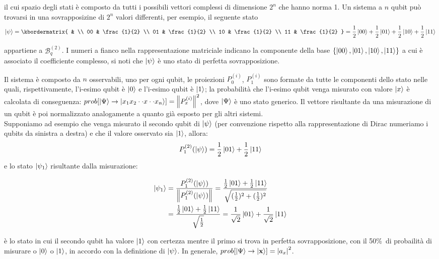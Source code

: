 \documentclass[12pt,a4paper,openright]{report}
\newcommand{\norm}[1]{\left\lVert#1\right\rVert}
\begin{document}
il cui spazio degli stati è composto da tutti i possibili vettori complessi di dimensione $2^n$ che hanno norma 1. Un sistema a $n$ qubit può trovarsi in una sovrapposizine di $2^n$ valori differenti, per esempio, il seguente stato  
\[
    \ket{\psi} = 
         \kbordermatrix{
              &    \\
          00 & \frac{1}{2} \\
          01 & \frac{1}{2} \\
          10 & \frac{1}{2} \\
          11 & \frac{1}{2}   
            } = \frac{1}{2}\ket{00} + \frac{1}{2}\ket{01} + \frac{1}{2}\ket{10} + \frac{1}{2}\ket{11}
\] 

appartiene a $\mathcal{B}_q^{(2)}$. I numeri a fianco nella rappresentazione matriciale indicano la componente della base $\{ \ket{00}, \ket{01}, \ket{10}, \ket{11} \}$ a cui è associato il coefficiente complesso,
si noti che $\ket{\psi}$ è uno stato di perfetta sovrapposizione.\par
Il sistema è composto da $n$ osservabili, uno per ogni qubit, le proiezioni ${P^{(i)}_0}$, ${P^{(i)}_1}$ sono formate da tutte le componenti dello stato nelle quali, rispettivamente, l'i-esimo qubit è $\ket0$
e l'i-esimo qubit è $\ket1$; la probabilità che l'i-esimo qubit venga misurato con valore $\ket{x}$ è calcolata di conseguenza:
$prob[\ket{\Psi} \rightarrow \ket{x_1 x_2 \cdot \cdot x \cdot \cdot x_n}]= \norm{{P^{(i)}_x}}^2$, dove $\ket{\Psi}$ è uno stato generico. Il vettore risultante da una misurazione di un qubit è poi normalizzato analogamente a quanto già esposto per gli altri sistemi.\\
Supponiamo ad esempio che venga misurato il secondo qubit di $\ket{\psi}$ (per convenzione rispetto alla rappresentazione di Dirac numeriamo i qubits da sinistra a destra) e che il valore osservato sia $\ket1$, allora:
\[
    {P^{(2)}_1}(\ket{\psi}) = \frac{1}{2}\ket{01} + \frac{1}{2}\ket{11}  
\]
e lo stato $\ket{\psi_1}$ risultante dalla misurazione:
\begin{center}
    \begin{align*}
        \ket{\psi_1} &= \frac{{P^{(2)}_1}(\ket{\psi}) }{ \norm{{P^{(2)}_1}(\ket{\psi})} } = \frac{\frac{1}{2}\ket{01} + \frac{1}{2}\ket{11}}{\sqrt{(\frac{1}{2})^2 + (\frac{1}{2})^2}}\\
        &= \frac{\frac{1}{2}\ket{01} + \frac{1}{2}\ket{11}}{\sqrt{\frac{1}{2}}} = \frac{1}{\sqrt2}\ket{01} + \frac{1}{\sqrt2}\ket{11}
    \end{align*}
\end{center}
è lo stato in cui il secondo qubit ha valore $\ket1$ con certezza mentre il primo si trova in perfetta sovrapposizione, con il 50\%\ di probailità di misurare o $\ket0$ o $\ket1$, in accordo con la definizione
di $\ket{\psi}$. In generale, $prob[\ket{\Psi} \rightarrow \ket{\textbf{x}}] ={\left\vert{a_x}\right\vert}^2$.\par
\end{document}
